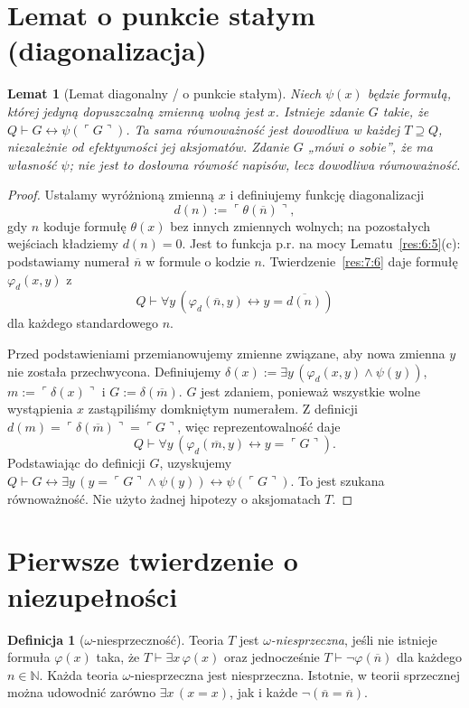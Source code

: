 \documentclass[11pt,a4paper]{article}
\numberwithin{equation}{section}
\theoremstyle{plain}
\newtheorem{lemat}[twierdzenie]{Lemat}
\theoremstyle{definition}
\newtheorem{definicja}[twierdzenie]{Definicja}
\theoremstyle{remark}
\begin{document}
\section{Lemat o punkcie stałym (diagonalizacja)}\label{sec:diagonalizacja}
\begin{lemat}[Lemat diagonalny / o punkcie stałym]\label{res:8:1}
Niech $\psi(x)$ będzie formułą, której jedyną dopuszczalną zmienną wolną jest $x$. Istnieje zdanie $G$ takie, że $Q\vdash G\leftrightarrow\psi(\ulcorner G\urcorner)$. Ta sama równoważność jest dowodliwa w każdej $T\supseteq Q$, niezależnie od efektywności jej aksjomatów. Zdanie $G$ „mówi o sobie”, że ma własność $\psi$; nie jest to dosłowna równość napisów, lecz dowodliwa równoważność.
\end{lemat}
\begin{proof}
Ustalamy wyróżnioną zmienną $x$ i definiujemy funkcję diagonalizacji
\[
d(n):=\ulcorner\theta(\overline n)\urcorner,
\]
gdy $n$ koduje formułę $\theta(x)$ bez innych zmiennych wolnych; na pozostałych wejściach kładziemy $d(n)=0$. Jest to funkcja p.r. na mocy Lematu~\ref{res:6:5}(c): podstawiamy numerał $\overline n$ w formule o kodzie $n$. Twierdzenie~\ref{res:7:6} daje formułę $\varphi_d(x,y)$ z
\[
Q\vdash\forall y\,(\varphi_d(\overline n,y)\leftrightarrow y=\overline{d(n)})
\]
dla każdego standardowego $n$.

Przed podstawieniami przemianowujemy zmienne związane, aby nowa zmienna $y$ nie została przechwycona. Definiujemy $\delta(x):=\exists y\,(\varphi_d(x,y)\land\psi(y))$, $m:=\ulcorner\delta(x)\urcorner$ i $G:=\delta(\overline m)$. $G$ jest zdaniem, ponieważ wszystkie wolne wystąpienia $x$ zastąpiliśmy domkniętym numerałem. Z definicji $d(m)=\ulcorner\delta(\overline m)\urcorner=\ulcorner G\urcorner$, więc reprezentowalność daje
\[
Q\vdash\forall y\,(\varphi_d(\overline m,y)\leftrightarrow y=\ulcorner G\urcorner).
\]
Podstawiając do definicji $G$, uzyskujemy $Q\vdash G\leftrightarrow\exists y\,(y=\ulcorner G\urcorner\land\psi(y))\leftrightarrow\psi(\ulcorner G\urcorner)$. To jest szukana równoważność. Nie użyto żadnej hipotezy o aksjomatach $T$.
\end{proof}

\section{Pierwsze twierdzenie o niezupełności}\label{sec:pierwsze-twierdzenie}
\begin{definicja}[$\omega$-niesprzeczność]\label{res:9:1}
Teoria $T$ jest \emph{$\omega$-niesprzeczna}, jeśli nie istnieje formuła $\varphi(x)$ taka, że $T\vdash\exists x\,\varphi(x)$ oraz jednocześnie $T\vdash\neg\varphi(\overline n)$ dla każdego $n\in\mathbb N$. Każda teoria $\omega$-niesprzeczna jest niesprzeczna. Istotnie, w teorii sprzecznej można udowodnić zarówno $\exists x\,(x=x)$, jak i każde $\neg(\overline n=\overline n)$.
\end{definicja}
\end{document}
